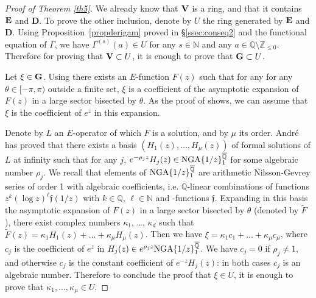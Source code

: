 \documentclass[reqno,12pt]{article}
\numberwithin{equation}{section}
\theoremstyle{remark}
\newcommand{\N}{\mathbb{N}}
\newcommand{\Z}{\mathbb{Z}}
\newcommand{\Q}{\mathbb{Q}}
\newcommand{\Qbar}{\overline{\mathbb Q}}
\newcommand{\tantie}{\foreignlanguage{russian}{\CYREREV}}
\newcommand{\antie}{\text{\tantie}}
\newcommand{\GG}{{\bf G}}
\newcommand{\VV}{{\bf V}}
\newcommand{\EE}{{\bf E}}
\newcommand{\fgo}{\mathfrak{f}}
\begin{document}
\begin{proof}[Proof of Theorem \ref{th5}] 
We already know that $\VV$ is a ring, and that it contains $\EE$ and  {\bf D}. To prove the other inclusion, denote by $U$ the ring generated by $\EE$ and  {\bf D}. Using Proposition~\ref{propderigam} proved in \S \ref{ssec:conseq2} and the functional equation of $\Gamma$, we have $\Gamma^{(s)}(a) \in U $ for any  $s\in\N$ and any $a\in\Q\setminus\Z_{\leq 0}$.   Therefore for proving that $\VV\subset U$, it is enough to prove that $\GG  \subset U$.

Let $\xi\in \GG$. Using \cite[Theorem 3]{probsiegel} there exists an $E$-function $F(z)$
such that for any for any $\theta\in[-\pi,\pi)$ 
outside a finite set, $\xi$  is a coefficient of the asymptotic expansion of $F(z)$ in a large sector
bisected by  $\theta$. As the proof of  \cite[Theorem 3]{probsiegel}  shows, we can assume that $\xi $ is the coefficient of $e^z$ in this expansion. 

Denote by $L$ an $E$-operator of which $F$ is a solution, and by $\mu$ its order. André has proved \cite{andre} that there exists a basis $(H_1(z),\ldots,H_\mu(z))$ of formal solutions of $L$ at infinity such that for any $ j$, $e^{-\rho_j z}H_j(z)\in {\rm NGA}\{1/z\}_1^{\Qbar}$ for some algebraic number $\rho_j$. We recall that elements of $ {\rm NGA}\{1/z\}_1^{\Qbar}$ are arithmetic Nilsson-Gevrey series of order 1 with algebraic coefficients, i.e. $\Qbar$-linear combinations of functions $z^k (\log z)^\ell \fgo(1/z)$ with $k\in\Q$, $\ell\in\N$ and \antie-functions $\fgo$. Expanding   in this basis the asymptotic expansion of $F(z)$ in a large   sector
bisected by  $\theta$ (denoted by $\widetilde F$), there exist complex numbers $\kappa_1$, \ldots, $\kappa_d$ such that $\widetilde F(z)= \kappa_1 H_1(z) + \ldots +  \kappa_\mu H_\mu(z)$. Then we have $\xi =  \kappa_1  c_1 + \ldots +  \kappa_\mu c_\mu$, where $c_j$ is the coefficient of $e^z $ in $H_j(z)\in e^{ \rho_j z}{\rm NGA}\{1/z\}_1^{\Qbar}$. We have $c_j = 0$ if $\rho_j\neq 1$, and otherwise $c_j $ is the constant coefficient of $e^{-z}H_j(z)$: in both cases $c_j$ is an algebraic number. Therefore to conclude the proof that $\xi\in U$, it is enough to prove that $\kappa_1  ,  \ldots ,  \kappa_\mu \in U$. 


\end{proof}
\end{document}
